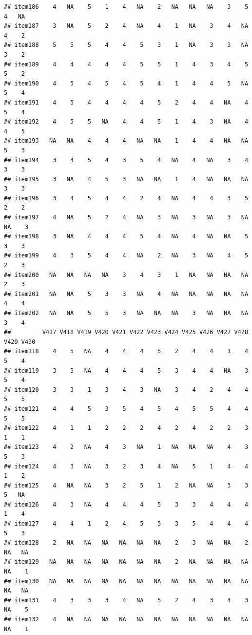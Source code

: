 \documentclass[
  man]{apa6}
\begin{document}
\begin{verbatim}
## item186    4   NA    5    1    4   NA    2   NA   NA   NA    3    5    4   NA
## item187    3   NA    5    2    4   NA    4    1   NA    3    4   NA    4    2
## item188    5    5    5    4    4    5    3    1   NA    3    3   NA    3    2
## item189    4    4    4    4    4    5    5    1    4    3    4    5    5    2
## item190    4    5    4    5    4    5    4    1    4    4    5   NA    5    4
## item191    4    5    4    4    4    4    5    2    4    4   NA    4    5    4
## item192    4    5    5   NA    4    4    5    1    4    3   NA    4    4    5
## item193   NA   NA    4    4    4   NA   NA    1    4    4   NA   NA    5    3
## item194    3    4    5    4    3    5    4   NA    4   NA    3    4    3    3
## item195    3   NA    4    5    3   NA   NA    1    4   NA   NA   NA    3    3
## item196    3    4    5    4    4    2    4   NA    4    4    3    5    2    2
## item197    4   NA    5    2    4   NA    3   NA    3   NA    3   NA   NA    3
## item198    3   NA    4    4    4    5    4   NA    4   NA   NA    5    3    3
## item199    4    3    5    4    4   NA    2   NA    3   NA    4    5    2    3
## item200   NA   NA   NA   NA    3    4    3    1   NA   NA   NA   NA    2    3
## item201   NA   NA    5    3    3   NA    4   NA   NA   NA   NA   NA    4    4
## item202   NA   NA    5    5    3   NA   NA   NA    3   NA   NA   NA    3    4
##         V417 V418 V419 V420 V421 V422 V423 V424 V425 V426 V427 V428 V429 V430
## item118    4    5   NA    4    4    4    5    2    4    4    1    4    5    4
## item119    3    5   NA    4    4    4    5    3    4    4   NA    3    5    4
## item120    3    3    1    3    4    3   NA    3    4    2    4    4    5    5
## item121    4    4    5    3    5    4    5    4    5    5    4    4    5    5
## item122    4    1    1    2    2    2    4    2    4    2    2    3    1    1
## item123    4    2   NA    4    3   NA    1   NA   NA   NA    4    3    5    3
## item124    4    3   NA    3    2    3    4   NA    5    1    4    4    1    2
## item125    4   NA   NA    3    2    5    1    2   NA   NA    3    3    5   NA
## item126    4    3   NA    4    4    4    5    3    3    4    4    4    1    4
## item127    4    4    1    2    4    5    5    3    5    4    4    4    5    3
## item128    2   NA   NA   NA   NA   NA   NA    2    3   NA   NA    2   NA   NA
## item129   NA   NA   NA   NA   NA   NA   NA    2   NA   NA   NA   NA   NA    1
## item130   NA   NA   NA   NA   NA   NA   NA   NA   NA   NA   NA   NA   NA   NA
## item131    4    3    3    3    4   NA    5    2    4    3    4    3   NA    5
## item132    4   NA   NA   NA   NA   NA   NA   NA   NA   NA   NA   NA   NA    1

\end{verbatim}
\end{document}
